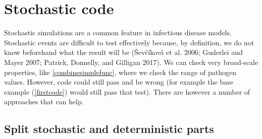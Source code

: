 \documentclass[]{elsarticle} %
\newenvironment{Shaded}{\begin{snugshade}}{\end{snugshade}}
\newcommand{\CommentTok}[1]{\textcolor[rgb]{0.56,0.35,0.01}{\textit{#1}}}
\newcommand{\ControlFlowTok}[1]{\textcolor[rgb]{0.13,0.29,0.53}{\textbf{#1}}}
\newcommand{\DataTypeTok}[1]{\textcolor[rgb]{0.13,0.29,0.53}{#1}}
\newcommand{\DecValTok}[1]{\textcolor[rgb]{0.00,0.00,0.81}{#1}}
\newcommand{\KeywordTok}[1]{\textcolor[rgb]{0.13,0.29,0.53}{\textbf{#1}}}
\newcommand{\NormalTok}[1]{#1}
\newcommand{\OperatorTok}[1]{\textcolor[rgb]{0.81,0.36,0.00}{\textbf{#1}}}
\newcommand{\StringTok}[1]{\textcolor[rgb]{0.31,0.60,0.02}{#1}}
\begin{document}
\begin{Shaded}
\end{Shaded}

\hypertarget{stochastic-code}{%
\section{Stochastic code}\label{stochastic-code}}

Stochastic simulations are a common feature in infectious disease models.
Stochastic events are difficult to test effectively because, by definition, we do not know beforehand what the result will be (Ševčíková et al. 2006; Guderlei and Mayer 2007; Patrick, Donnelly, and Gilligan 2017).
We can check very broad-scale properties, like \ref{combinesimplefunc}, where we check the range of pathogen values.
However, code could still pass and be wrong (for example the base example (\ref{firstcode}) would still pass that test).
There are however a number of approaches that can help.

\hypertarget{splitstochastic}{%
\subsection*{Split stochastic and deterministic parts}\label{splitstochastic}}
\end{document}
